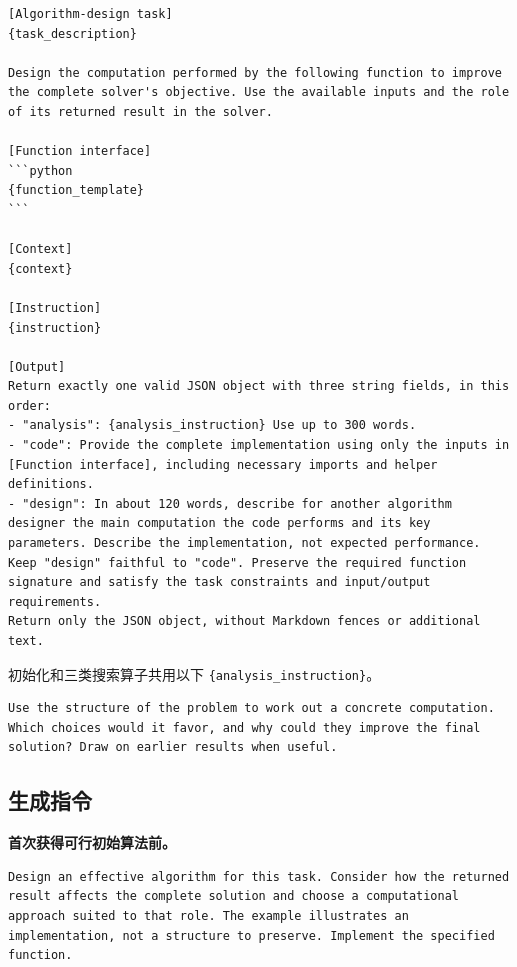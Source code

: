 \documentclass{article}
\begin{document}
\noindent\begin{minipage}{\linewidth}
\begin{verbatim}
[Algorithm-design task]
{task_description}

Design the computation performed by the following function to improve the complete solver's objective. Use the available inputs and the role of its returned result in the solver.

[Function interface]
```python
{function_template}
```

[Context]
{context}

[Instruction]
{instruction}

[Output]
Return exactly one valid JSON object with three string fields, in this order:
- "analysis": {analysis_instruction} Use up to 300 words.
- "code": Provide the complete implementation using only the inputs in [Function interface], including necessary imports and helper definitions.
- "design": In about 120 words, describe for another algorithm designer the main computation the code performs and its key parameters. Describe the implementation, not expected performance.
Keep "design" faithful to "code". Preserve the required function signature and satisfy the task constraints and input/output requirements.
Return only the JSON object, without Markdown fences or additional text.
\end{verbatim}
\end{minipage}\par

初始化和三类搜索算子共用以下 \texttt{\{analysis\_instruction\}}。

\noindent\begin{minipage}{\linewidth}
\begin{verbatim}
Use the structure of the problem to work out a concrete computation. Which choices would it favor, and why could they improve the final solution? Draw on earlier results when useful.
\end{verbatim}
\end{minipage}\par

\subsection{生成指令}\label{ux751fux6210ux6307ux4ee4}

\noindent\begin{minipage}{\linewidth}
\textbf{首次获得可行初始算法前。}

\begin{verbatim}
Design an effective algorithm for this task. Consider how the returned result affects the complete solution and choose a computational approach suited to that role. The example illustrates an implementation, not a structure to preserve. Implement the specified function.
\end{verbatim}
\end{minipage}\par
\end{document}
